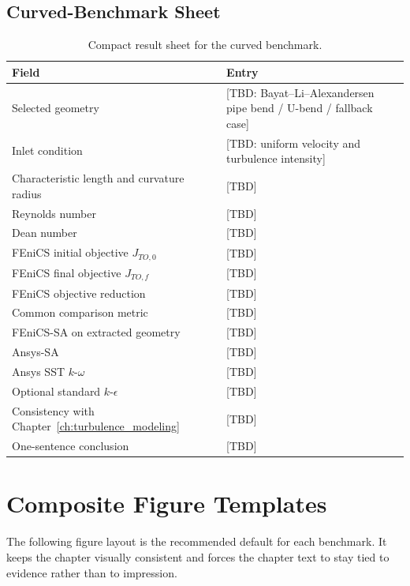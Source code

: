 \subsection{Curved-Benchmark Sheet}
\begin{table}[htbp]
	\centering
	\footnotesize
	\caption{Compact result sheet for the curved benchmark.}
	\label{tab:app_curved_sheet}
	\renewcommand{\arraystretch}{1.2}
	\begin{tabularx}{\textwidth}{l X}
		\hline
		\textbf{Field} & \textbf{Entry} \\
		\hline
		Selected geometry & [TBD: Bayat--Li--Alexandersen pipe bend / U-bend / fallback case] \\
		Inlet condition & [TBD: uniform velocity and turbulence intensity] \\
		Characteristic length and curvature radius & [TBD] \\
		Reynolds number & [TBD] \\
		Dean number & [TBD] \\
		FEniCS initial objective $J_{TO,0}$ & [TBD] \\
		FEniCS final objective $J_{TO,f}$ & [TBD] \\
		FEniCS objective reduction & [TBD] \\
		Common comparison metric & [TBD] \\
		FEniCS-SA on extracted geometry & [TBD] \\
		Ansys-SA & [TBD] \\
		Ansys SST $k$-$\omega$ & [TBD] \\
		Optional standard $k$-$\epsilon$ & [TBD] \\
		Consistency with Chapter~\ref{ch:turbulence_modeling} & [TBD] \\
		One-sentence conclusion & [TBD] \\
		\hline
	\end{tabularx}
\end{table}

\section{Composite Figure Templates}
The following figure layout is the recommended default for each benchmark. It keeps the chapter visually consistent and forces the chapter text to stay tied to evidence rather than to impression.

